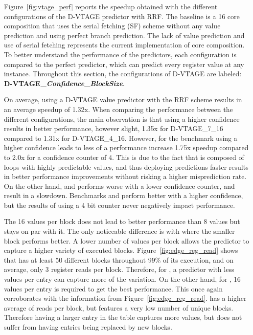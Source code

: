 Figure~\ref{fig:vtage_perf} reports the speedup obtained with the different configurations of the D-VTAGE predictor with RRF.
The baseline is a 16 core composition that uses the serial fetching (SF) scheme without any value prediction and using perfect branch prediction.
The lack of value prediction and use of serial fetching represents the current implementation of core composition.
To better understand the performance of the predictors, each configuration is compared to the perfect predictor, which can predict every register value at any instance.
Throughout this section, the configurations of D-VTAGE are labeled: \textbf{D-VTAGE\_\textit{Confidence}\_\textit{BlockSize}}.

On average, using a D-VTAGE value predictor with the RRF scheme results in an average speedup of 1.32x.
When comparing the performance between the different configurations, the main observation is that using a higher confidence results in better performance, however slight, 1.35x for D-VTAGE\_7\_16 compared to 1.31x for D-VTAGE\_4\_16.
However, for the benchmark  using a higher confidence leads to less of a performance increase 1.75x speedup compared to 2.0x for a confidence counter of 4.
This is due to the fact that  is composed of loops with highly predictable values, and thus deploying predictions faster results in better performance improvements without risking a higher misprediction rate.
On the other hand,  and  performs worse with a lower confidence counter, and result in a slowdown.
Benchmarks  and  perform better with a higher confidence, but the results of using a 4 bit counter never negatively impact performance.

The 16 values per block does not lead to better performance than 8 values but stays on par with it.
The only noticeable difference is with  where the smaller block performs better.
A lower number of values per block allows the predictor to capture a higher variety of executed blocks.
Figure~\ref{fig:edge_reg_read} shows that  has at least 50 different blocks throughout 99\% of its execution, and on average, only 3 register reads per block.
Therefore, for , a predictor with less values per entry can capture more of the variation.
On the other hand, for , 16 values per entry is required to get the best performance.
This once again corroborates with the information from Figure~\ref{fig:edge_reg_read}.
 has a higher average of reads per block, but features a very low number of unique blocks.
Therefore having a larger entry in the table captures more values, but does not suffer from having entries being replaced by new blocks.

